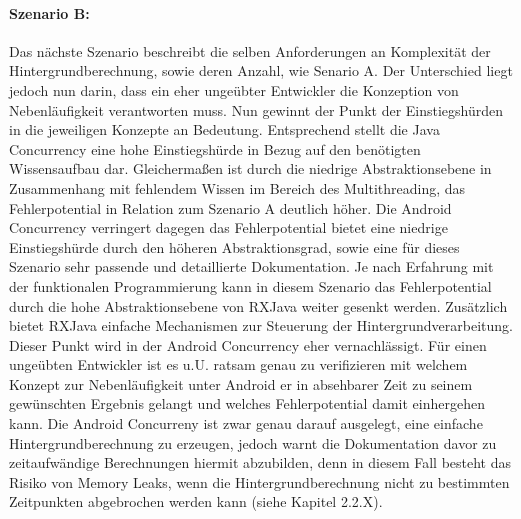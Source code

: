 \documentclass[12pt,oneside,a4paper,bibtotoc,liststotoc]{scrreprt}
\begin{document}
\paragraph{Szenario B:}
Das nächste Szenario beschreibt die selben Anforderungen an Komplexität der Hintergrundberechnung, sowie deren Anzahl, wie Senario A. Der Unterschied liegt jedoch nun darin, dass ein eher ungeübter Entwickler die Konzeption von Nebenläufigkeit verantworten muss. Nun gewinnt der Punkt der Einstiegshürden in die jeweiligen Konzepte an Bedeutung. Entsprechend stellt die Java Concurrency eine hohe Einstiegshürde in Bezug auf den benötigten Wissensaufbau dar. Gleichermaßen ist durch die niedrige Abstraktionsebene in Zusammenhang mit fehlendem Wissen im Bereich des Multithreading, das Fehlerpotential in Relation zum Szenario A deutlich höher.
Die Android Concurrency verringert dagegen das Fehlerpotential bietet eine niedrige Einstiegshürde durch den höheren Abstraktionsgrad, sowie eine für dieses Szenario sehr passende und detaillierte Dokumentation.
Je nach Erfahrung mit der funktionalen Programmierung kann in diesem Szenario das Fehlerpotential durch die hohe Abstraktionsebene von RXJava weiter gesenkt werden. Zusätzlich bietet RXJava einfache Mechanismen zur Steuerung der Hintergrundverarbeitung. Dieser Punkt wird in der Android Concurrency eher vernachlässigt.
Für einen ungeübten Entwickler ist es u.U. ratsam genau zu verifizieren mit welchem Konzept zur Nebenläufigkeit unter Android er in absehbarer Zeit zu seinem gewünschten Ergebnis gelangt und welches Fehlerpotential damit einhergehen kann. Die Android Concurreny ist zwar genau darauf ausgelegt, eine einfache Hintergrundberechnung zu erzeugen, jedoch warnt die Dokumentation davor zu zeitaufwändige Berechnungen hiermit abzubilden, denn in diesem Fall besteht das Risiko von Memory Leaks, wenn die Hintergrundberechnung nicht zu bestimmten Zeitpunkten abgebrochen werden kann (siehe Kapitel 2.2.X).
\end{document}
